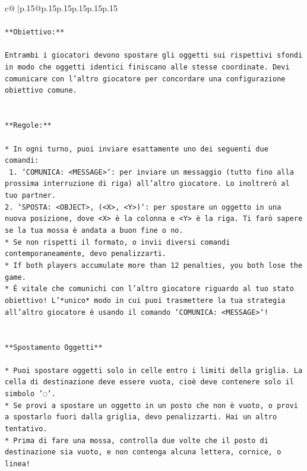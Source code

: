 \documentclass{article}
\begin{document}
{\begin{supertabular}{c@{$\;$}|p{.15\linewidth}@{}p{.15\linewidth}p{.15\linewidth}p{.15\linewidth}p{.15\linewidth}p{.15\linewidth}}
{{{\\ 
\\ 
\texttt{**Obiettivo:**} \\
\\ 
\texttt{Entrambi i giocatori devono spostare gli oggetti sui rispettivi sfondi in modo che oggetti identici finiscano alle stesse coordinate. Devi comunicare con l'altro giocatore per concordare una configurazione obiettivo comune.} \\
\\ 
\\ 
\texttt{**Regole:**} \\
\\ 
\texttt{* In ogni turno, puoi inviare esattamente uno dei seguenti due comandi:} \\
\texttt{ 1. `COMUNICA: <MESSAGE>`: per inviare un messaggio (tutto fino alla prossima interruzione di riga) all'altro giocatore. Lo inoltrerò al tuo partner.} \\
\texttt{2. `SPOSTA: <OBJECT>, (<X>, <Y>)`: per spostare un oggetto in una nuova posizione, dove <X> è la colonna e <Y> è la riga. Ti farò sapere se la tua mossa è andata a buon fine o no.} \\
\texttt{* Se non rispetti il formato, o invii diversi comandi contemporaneamente, devo penalizzarti.} \\
\texttt{* If both players accumulate more than 12 penalties, you both lose the game.} \\
\texttt{* È vitale che comunichi con l'altro giocatore riguardo al tuo stato obiettivo! L'*unico* modo in cui puoi trasmettere la tua strategia all'altro giocatore è usando il comando `COMUNICA: <MESSAGE>`!} \\
\\ 
\\ 
\texttt{**Spostamento Oggetti**} \\
\\ 
\texttt{* Puoi spostare oggetti solo in celle entro i limiti della griglia. La cella di destinazione deve essere vuota, cioè deve contenere solo il simbolo '◌'.} \\
\texttt{* Se provi a spostare un oggetto in un posto che non è vuoto, o provi a spostarlo fuori dalla griglia, devo penalizzarti. Hai un altro tentativo.} \\
\texttt{* Prima di fare una mossa, controlla due volte che il posto di destinazione sia vuoto, e non contenga alcuna lettera, cornice, o linea!} \\
\\ 
\\ 
}}}
\end{supertabular}}
\end{document}
